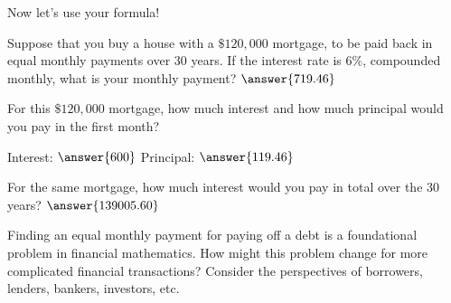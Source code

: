 \documentclass[handout,space,nooutcomes]{ximera}
\begin{document}
\newpage 

Now let's use your formula!  

\begin{question}
Suppose that you buy a house with a $\$120,000$ mortgage, to be
paid back in equal monthly payments over $30$ years.  If the interest
rate is $6\%$, compounded monthly, what is your monthly payment? $\answer{719.46}$
\begin{freeResponse}
\end{freeResponse}
\vfill
\end{question}

\begin{question}
For this $\$120,000$ mortgage, how much interest and how much principal
would you pay in the first month?  

Interest: $\answer{600}$
Principal:  $\answer{119.46}$
\end{question}

\begin{question}
For the same mortgage, how much interest would you pay in total over the $30$ years?
$\answer{139005.60}$
\end{question}

\newpage

\begin{question}
Finding an equal monthly payment for paying off a debt is a foundational problem in financial mathematics.  
How might this problem change for more complicated financial transactions?  Consider the perspectives of 
borrowers, lenders, bankers, investors, etc.  
\begin{freeResponse}
\end{freeResponse}
\end{question}
\end{document}
